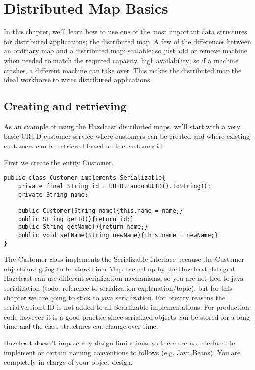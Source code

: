 \chapter{Distributed Map Basics}

In this chapter, we'll learn how to use one of the most important data structures for distributed applications; the distributed map. A few of the differences between an ordinary map and a distributed map:
scalable; so just add or remove machine when needed to match the required capacity. 
high availability; so if a machine crashes, a different machine can take over. 
This makes the distributed map the ideal workhorse to write distributed applications.

\section{Creating and retrieving}

As an example of using the Hazelcast distributed maps, we'll start with a  very basic CRUD customer service where customers can be created and where existing customers can be retrieved based on the customer id.

First we create the entity Customer. 

\begin{verbatim}
public class Customer implements Serializable{
    private final String id = UUID.randomUUID().toString();
    private String name;
	
    public Customer(String name){this.name = name;}
    public String getId(){return id;}
    public String getName(){return name;}
    public void setName(String newName){this.name = newName;}
}
\end{verbatim}

The Customer class implements the Serializable interface because the Customer objects are going to be stored in a Map backed up by the Hazelcast datagrid. Hazelcast can use different serialization mechanisms, so you are not tied to java serialization (todo: reference to serialization explanation/topic), but for this chapter we are going to stick to java serialization. For brevity reasons the serialVersionUID is not added to all Serializable implementations. For production code however it is a good practice since serialized objects can be stored for a long time and the class structures can change over time. 

Hazelcast doesn't impose any design limitations, so there are no interfaces to implement or certain naming conventions to follows (e.g. Java Beans). You are completely in charge of your object design.

